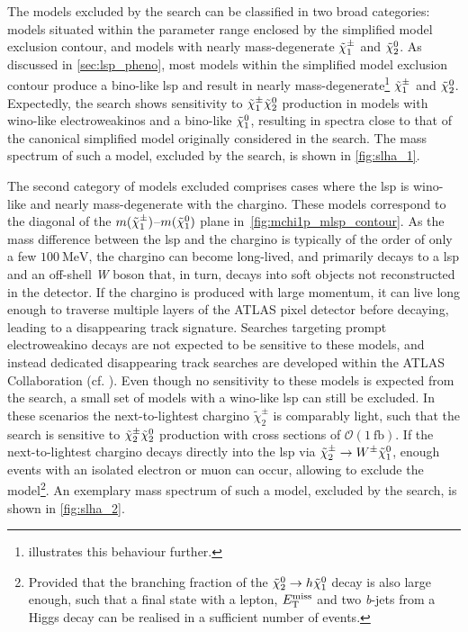 The models excluded by the \onelepton search can be classified in two broad categories: models situated within the parameter range enclosed by the simplified model exclusion contour, and models with nearly mass-degenerate $\tilde{\chi}_1^\pm$ and $\tilde{\chi}_2^0$.
As discussed in \cref{sec:lsp_pheno}, most models within the simplified model exclusion contour produce a bino-like \gls{lsp} and result in nearly mass-degenerate\footnote{ illustrates this behaviour further.} $\tilde{\chi}_1^\pm$ and $\tilde{\chi}_2^0$.
Expectedly, the \onelepton search shows sensitivity to $\tilde{\chi}_1^\pm\tilde{\chi}_2^0$ production in models with wino-like electroweakinos and a bino-like $\tilde{\chi}_1^0$, resulting in spectra close to that of the canonical simplified model originally considered in the search.
The mass spectrum of such a model, excluded by the \onelepton search, is shown in \cref{fig:slha_1}.

The second category of models excluded comprises cases where the \gls{lsp} is wino-like and nearly mass-degenerate with the chargino. These models correspond to the diagonal of the $m(\tilde{\chi}_1^\pm)$--$m(\tilde{\chi}_1^0)$ plane in~\cref{fig:mchi1p_mlsp_contour}. As the mass difference between the \gls{lsp} and the chargino is typically of the order of only a few $\SI{100}{\MeV}$, the chargino can become long-lived, and primarily decays to a \gls{lsp} and an off-shell \textit{W} boson that, in turn, decays into soft objects not reconstructed in the detector.
If the chargino is produced with large momentum, it can live long enough to traverse multiple layers of the ATLAS pixel detector before decaying, leading to a disappearing track signature. Searches targeting prompt electroweakino decays are not expected to be sensitive to these models, and instead dedicated disappearing track searches are developed within the ATLAS Collaboration (cf. \cite{ATLAS-CONF-2021-015}). 
Even though no sensitivity to these models is expected from the \onelepton search, a small set of models with a wino-like \gls{lsp} can still be excluded. In these scenarios the next-to-lightest chargino $\tilde{\chi}^\pm_2$ is comparably light, such that the \onelepton search is sensitive to $\tilde{\chi}^\pm_2\tilde{\chi}_2^0$ production with cross sections of $\mathcal{O}(\SI{1}{\femto\barn})$.
If the next-to-lightest chargino decays directly into the \gls{lsp} via $\tilde{\chi}^\pm_2 \rightarrow W^\pm \tilde{\chi}_1^0$, enough events with an isolated electron or muon can occur, allowing to exclude the model\footnote{Provided that the branching fraction of the $\tilde{\chi}_2^0 \rightarrow h \tilde{\chi}_1^0$ decay is also large enough, such that a final state with a lepton, $E_{\textrm{T}}^{\textrm{miss}}$ and two \textit{b}-jets from a Higgs decay can be realised in a sufficient number of events.}. An exemplary mass spectrum of such a model, excluded by the \onelepton search, is shown in \cref{fig:slha_2}.

